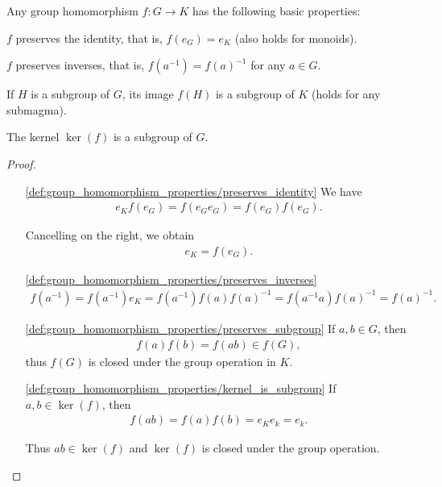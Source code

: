 \begin{proposition}\label{thm:group_homomorphism_properties}
  Any group homomorphism \( f: G \to K \) has the following basic properties:
  \begin{defenum}
    \item\label{def:group_homomorphism_properties/preserves_identity} \( f \) preserves the identity, that is, \( f(e_G) = e_K \) (also holds for monoids).
    \item\label{def:group_homomorphism_properties/preserves_inverses} \( f \) preserves inverses, that is, \( f(a^{-1}) = f(a)^{-1} \) for any \( a \in G \).
    \item\label{def:group_homomorphism_properties/preserves_subgroup} If \( H \) is a subgroup of \( G \), its image \( f(H) \) is a subgroup of \( K \) (holds for any submagma).
    \item\label{def:group_homomorphism_properties/kernel_is_subgroup} The kernel \( \ker(f) \) is a subgroup of \( G \).
  \end{defenum}
\end{proposition}
\begin{proof}\mbox{}
  \begin{itemize}
    \item[\ref{def:group_homomorphism_properties/preserves_identity}] We have
    \begin{align*}
      e_K f(e_G) = f(e_G e_G) = f(e_G) f(e_G).
    \end{align*}

    Cancelling on the right, we obtain
    \begin{align*}
      e_K = f(e_G).
    \end{align*}

    \item[\ref{def:group_homomorphism_properties/preserves_inverses}]
    \begin{align*}
      f(a^{-1})
      =
      f(a^{-1}) e_K
      =
      f(a^{-1}) f(a) f(a)^{-1}
      =
      f(a^{-1} a) f(a)^{-1}
      =
      f(a)^{-1}.
    \end{align*}

    \item[\ref{def:group_homomorphism_properties/preserves_subgroup}] If \( a, b \in G \), then
    \begin{align*}
      f(a) f(b) = f(ab) \in f(G),
    \end{align*}
    thus \( f(G) \) is closed under the group operation in \( K \).

    \item[\ref{def:group_homomorphism_properties/kernel_is_subgroup}] If \( a, b \in \ker(f) \), then
    \begin{align*}
      f(ab) = f(a) f(b) = e_K e_k = e_k.
    \end{align*}

    Thus \( ab \in \ker(f) \) and \( \ker(f) \) is closed under the group operation.
  \end{itemize}
\end{proof}

